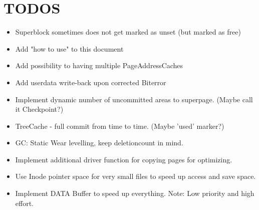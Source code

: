 \section{TODOS}
\begin{itemize}
    \item Superblock sometimes does not get marked as unset (but marked as free)
    \item Add "how to use" to this document
    \item Add possibility to having multiple PageAddressCaches
    \item Add userdata write-back upon corrected Biterror
    \item Implement dynamic number of uncommitted areas to superpage. (Maybe call it Checkpoint?)
    \item TreeCache - full commit from time to time. (Maybe 'used' marker?)
    \item GC: Static Wear levelling, keep deletioncount in mind.
    \item Implement additional driver function for copying pages for optimizing.
    \item Use Inode pointer space for very small files to speed up access and save space.
    \item Implement DATA Buffer to speed up everything. Note: Low priority and high effort.
\end{itemize}
